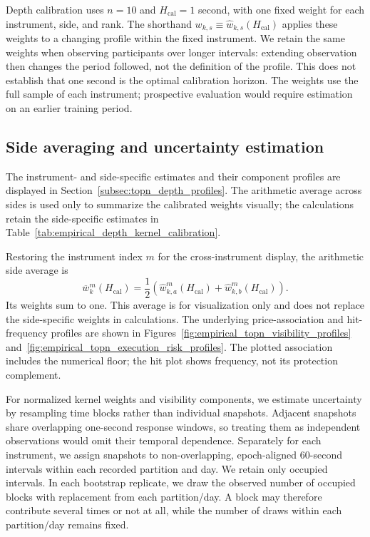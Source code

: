 \begin{review}
Depth calibration uses $n=10$ and $H_{\mathrm{cal}}=1$ second, with one fixed weight for each instrument, side, and rank. The shorthand $w_{k,s}\equiv\widehat w_{k,s}(H_{\mathrm{cal}})$ applies these weights to a changing profile within the fixed instrument. We retain the same weights when observing participants over longer intervals: extending observation then changes the period followed, not the definition of the profile. This does not establish that one second is the optimal calibration horizon. The weights use the full sample of each instrument; prospective evaluation would require estimation on an earlier training period.
\end{review}

\subsection{Side averaging and uncertainty estimation}
\label{sec:profile_details}
The instrument- and side-specific estimates and their component profiles are displayed in Section~\ref{subsec:topn_depth_profiles}. The arithmetic average across sides is used only to summarize the calibrated weights visually; the calculations retain the side-specific estimates in Table~\ref{tab:empirical_depth_kernel_calibration}.


Restoring the instrument index $m$ for the cross-instrument display, the arithmetic side average is
\begin{equation}
    \overline w^{m}_{k}(H_{\mathrm{cal}})
    =
    \frac{1}{2}\left(
        \widehat w^{m}_{k,a}(H_{\mathrm{cal}})
        +
        \widehat w^{m}_{k,b}(H_{\mathrm{cal}})
    \right).
    \label{eq:side_averaged_empirical_kernel}
\end{equation}
Its weights sum to one. This average is for visualization only and does not replace the side-specific weights in calculations. The underlying price-association and hit-frequency profiles are shown in Figures~\ref{fig:empirical_topn_visibility_profiles} and~\ref{fig:empirical_topn_execution_risk_profiles}. The plotted association includes the numerical floor; the hit plot shows frequency, not its protection complement.

For normalized kernel weights and visibility components, we estimate uncertainty by resampling time blocks rather than individual snapshots. Adjacent snapshots share overlapping one-second response windows, so treating them as independent observations would omit their temporal dependence. Separately for each instrument, we assign snapshots to non-overlapping, epoch-aligned 60-second intervals within each recorded partition and day. We retain only occupied intervals. In each bootstrap replicate, we draw the observed number of occupied blocks with replacement from each partition/day. A block may therefore contribute several times or not at all, while the number of draws within each partition/day remains fixed.

